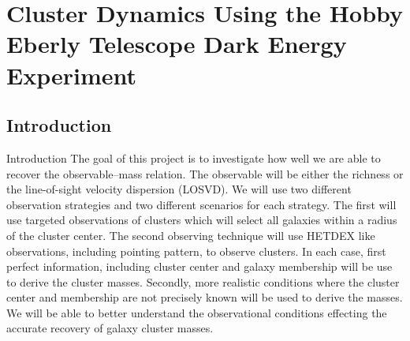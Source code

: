 \documentclass[12pt]{article}
\begin{document}

\section{Cluster Dynamics Using the Hobby Eberly Telescope Dark Energy Experiment}\label{sec:hetdex project}
\subsection{Introduction}
\begin{outline}[enumerate]
	\1 Introduction
		\2 The goal of this project is to investigate how well we are able to recover the observable--mass relation. The observable will be either the richness or the line-of-sight velocity dispersion (LOSVD). We will use two different observation strategies and two different scenarios for each strategy. The first will use targeted observations of clusters which will select all galaxies within a radius of the cluster center. The second observing technique will use HETDEX like observations, including pointing pattern, to observe clusters. In each case, first perfect information, including cluster center and galaxy membership will be use to derive the cluster masses. Secondly, more realistic conditions where the cluster center and membership are not precisely known will be used to derive the masses. We will be able to better understand the observational conditions effecting the accurate recovery of galaxy cluster masses.
\end{outline}
\end{document}

